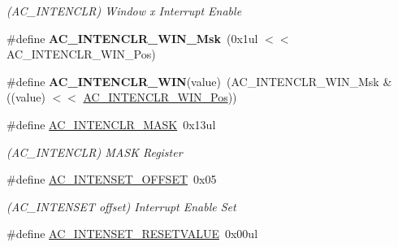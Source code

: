\begin{DoxyCompactItemize}
\begin{DoxyCompactList}\small\item\em (A\+C\+\_\+\+I\+N\+T\+E\+N\+C\+L\+R) Window x Interrupt Enable \end{DoxyCompactList}\item 
\hypertarget{group___s_a_m_l21___a_c_gab4294d48eadea96d023982f380d46e16}{}\#define {\bfseries A\+C\+\_\+\+I\+N\+T\+E\+N\+C\+L\+R\+\_\+\+W\+I\+N\+\_\+\+Msk}~(0x1ul $<$$<$ A\+C\+\_\+\+I\+N\+T\+E\+N\+C\+L\+R\+\_\+\+W\+I\+N\+\_\+\+Pos)\label{group___s_a_m_l21___a_c_gab4294d48eadea96d023982f380d46e16}

\item 
\hypertarget{group___s_a_m_l21___a_c_ga769748a638fde3114b53f42ef6e69bb0}{}\#define {\bfseries A\+C\+\_\+\+I\+N\+T\+E\+N\+C\+L\+R\+\_\+\+W\+I\+N}(value)~(A\+C\+\_\+\+I\+N\+T\+E\+N\+C\+L\+R\+\_\+\+W\+I\+N\+\_\+\+Msk \& ((value) $<$$<$ \hyperlink{group___s_a_m_l21___a_c_ga0db0a40e376eff9df159115da9de0920}{A\+C\+\_\+\+I\+N\+T\+E\+N\+C\+L\+R\+\_\+\+W\+I\+N\+\_\+\+Pos}))\label{group___s_a_m_l21___a_c_ga769748a638fde3114b53f42ef6e69bb0}

\item 
\hypertarget{group___s_a_m_l21___a_c_ga9c1df17ec7ebc764d76c0432181c94a2}{}\#define \hyperlink{group___s_a_m_l21___a_c_ga9c1df17ec7ebc764d76c0432181c94a2}{A\+C\+\_\+\+I\+N\+T\+E\+N\+C\+L\+R\+\_\+\+M\+A\+S\+K}~0x13ul\label{group___s_a_m_l21___a_c_ga9c1df17ec7ebc764d76c0432181c94a2}

\begin{DoxyCompactList}\small\item\em (A\+C\+\_\+\+I\+N\+T\+E\+N\+C\+L\+R) M\+A\+S\+K Register \end{DoxyCompactList}\item 
\hypertarget{group___s_a_m_l21___a_c_gace22713b52e7875bc9d364ff71821f03}{}\#define \hyperlink{group___s_a_m_l21___a_c_gace22713b52e7875bc9d364ff71821f03}{A\+C\+\_\+\+I\+N\+T\+E\+N\+S\+E\+T\+\_\+\+O\+F\+F\+S\+E\+T}~0x05\label{group___s_a_m_l21___a_c_gace22713b52e7875bc9d364ff71821f03}

\begin{DoxyCompactList}\small\item\em (A\+C\+\_\+\+I\+N\+T\+E\+N\+S\+E\+T offset) Interrupt Enable Set \end{DoxyCompactList}\item 
\hypertarget{group___s_a_m_l21___a_c_ga567ae9819bd9349410623b23b8cc04e8}{}\#define \hyperlink{group___s_a_m_l21___a_c_ga567ae9819bd9349410623b23b8cc04e8}{A\+C\+\_\+\+I\+N\+T\+E\+N\+S\+E\+T\+\_\+\+R\+E\+S\+E\+T\+V\+A\+L\+U\+E}~0x00ul\label{group___s_a_m_l21___a_c_ga567ae9819bd9349410623b23b8cc04e8}


\end{DoxyCompactItemize}
